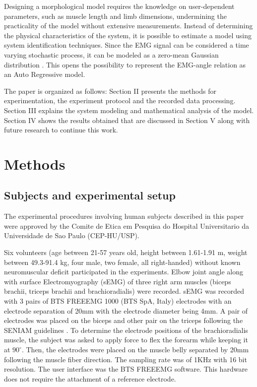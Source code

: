 \documentclass[letterpaper, 10 pt, conference]{ieeeconf}  %
\begin{document}
Designing a morphological model requires the knowledge on user-dependent parameters, such as muscle length and limb dimensions, undermining the practicality of the model without extensive measurements. Instead of determining the physical characteristics of the system, it is possible to estimate a model using system identification techniques. Since the EMG signal can be considered a time varying stochastic process, it can be modeled as a zero-mean Gaussian distribution \cite{Hogan4123280,Hogan4123279}. This opens the possibility to represent the EMG-angle relation as an Auto Regressive model.

The paper is organized as follows: Section II presents the methods for experimentation, the experiment protocol and the recorded data processing. Section III explains the system modeling and mathematical analysis of the model. Section IV shows the results obtained that are discussed in Section V along with future research to continue this work.

\section{Methods}
\subsection{Subjects and experimental setup}
The experimental procedures involving human subjects described in this paper were approved by the Comite de Etica em Pesquisa do Hospital Universitario da Universidade de Sao Paulo (CEP-HU/USP).

Six volunteers (age between 21-57 years old, height between 1.61-1.91 m, weight between 49.3-91.4 kg, four male, two female, all right-handed) without known neuromuscular deficit participated in the experiments. Elbow joint angle along with surface Electromyography (sEMG) of three right arm muscles (biceps brachii,  triceps brachii and brachioradialis) were recorded. 
sEMG was recorded with 3 pairs of BTS FREEEMG 1000 (BTS SpA, Italy) electrodes with an electrode separation of 20mm with the electrode diameter being 4mm. A pair of electrodes was placed on the biceps and other pair on the triceps following the SENIAM guidelines \cite{SENIAM20170110}. To determine the electrode positions of the brachioradialis muscle, the subject was asked to apply force to flex the forearm while keeping it at \(90^{\circ}\). Then, the electrodes were placed on the muscle belly separated by 20mm following the muscle fiber direction. The sampling rate was of 1KHz with 16 bit resolution. The user interface was the BTS FREEEMG software. This hardware does not require the attachment of a reference electrode.
\end{document}
